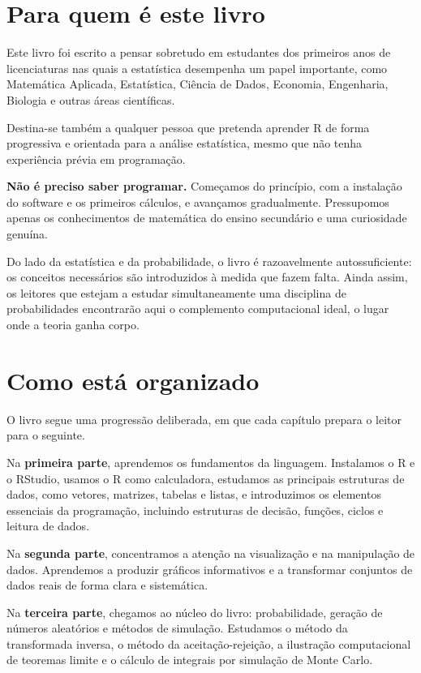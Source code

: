 \documentclass[
  portuguese,
  11pt,
  openany]{book}
\begin{document}
\section{Para quem é este livro}\label{para-quem-uxe9-este-livro}

Este livro foi escrito a pensar sobretudo em estudantes dos primeiros anos de licenciaturas nas quais a estatística desempenha um papel importante, como Matemática Aplicada, Estatística, Ciência de Dados, Economia, Engenharia, Biologia e outras áreas científicas.

Destina-se também a qualquer pessoa que pretenda aprender R de forma progressiva e orientada para a análise estatística, mesmo que não tenha experiência prévia em programação.

\textbf{Não é preciso saber programar.} Começamos do princípio, com a instalação do
software e os primeiros cálculos, e avançamos gradualmente. Pressupomos apenas os
conhecimentos de matemática do ensino secundário e uma curiosidade genuína.

Do lado da estatística e da probabilidade, o livro é razoavelmente
autossuficiente: os conceitos necessários são introduzidos à medida que fazem
falta. Ainda assim, os leitores que estejam a estudar simultaneamente uma
disciplina de probabilidades encontrarão aqui o complemento computacional
ideal, o lugar onde a teoria ganha corpo.

\section{Como está organizado}\label{como-estuxe1-organizado}

O livro segue uma progressão deliberada, em que cada capítulo prepara o leitor para o seguinte.

Na \textbf{primeira parte}, aprendemos os fundamentos da linguagem. Instalamos o R e o RStudio, usamos o R como calculadora, estudamos as principais estruturas de dados, como vetores, matrizes, tabelas e listas, e introduzimos os elementos essenciais da programação, incluindo estruturas de decisão, funções, ciclos e leitura de dados.

Na \textbf{segunda parte}, concentramos a atenção na visualização e na manipulação de dados. Aprendemos a produzir gráficos informativos e a transformar conjuntos de dados reais de forma clara e sistemática.

Na \textbf{terceira parte}, chegamos ao núcleo do livro: probabilidade, geração de números aleatórios e métodos de simulação. Estudamos o método da transformada inversa, o método da aceitação-rejeição, a ilustração computacional de teoremas limite e o cálculo de integrais por simulação de Monte Carlo.
\end{document}
